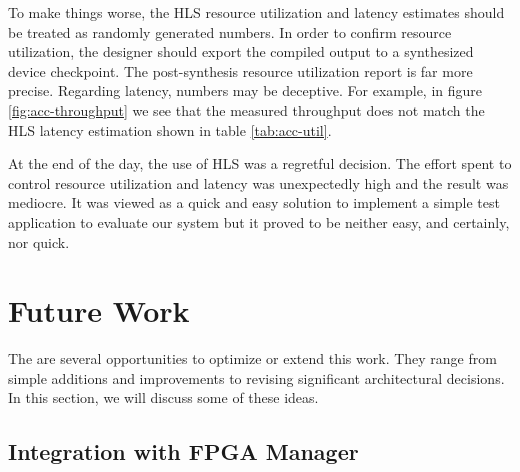 To make things worse, the HLS resource utilization and latency estimates should be treated as randomly generated numbers.
In order to confirm resource utilization, the designer should export the compiled output to a synthesized device checkpoint.
The post-synthesis resource utilization report is far more precise. Regarding latency, numbers may be deceptive. For example,
in figure \ref{fig:acc-throughput} we see that the measured throughput does not match the HLS latency estimation shown in table \ref{tab:acc-util}.



At the end of the day, the use of HLS was a regretful decision.
The effort spent to control resource utilization and latency was unexpectedly high and the result was mediocre.
It was viewed as a quick and easy solution to implement a simple test application to evaluate our system 
but it proved to be neither easy, and certainly, nor quick.

\section{Future Work}

The are several opportunities to optimize or extend this work.
They range from simple additions and improvements to 
revising significant architectural decisions.
In this section, we will discuss some of these ideas.

\subsection{Integration with FPGA Manager}

